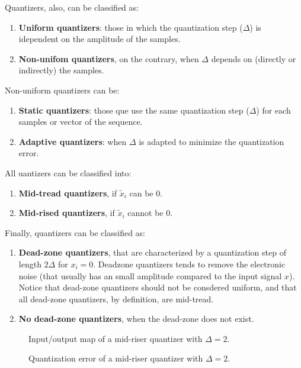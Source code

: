 Quantizers, also, can be classified as:
\begin{enumerate}
\item \textbf{Uniform quantizers}: those in which the quantization
  step ($\Delta$) is idependent on the amplitude of the samples.
\item \textbf{Non-unifom quantizers}, on the contrary, when $\Delta$
  depends on (directly or indirectly) the samples.
\end{enumerate}

Non-uniform quantizers can be:
\begin{enumerate}
\item \textbf{Static quantizers}: those que use the same quantization
  step ($\Delta$) for each samples or vector of the sequence.
\item \textbf{Adaptive quantizers}: when $\Delta$ is adapted to
  minimize the quantization error.
\end{enumerate}

All uantizers can be classified into:
\begin{enumerate}
\item \textbf{Mid-tread quantizers}, if $\tilde{x}_i$ can be $0$.
\item \textbf{Mid-rised quantizers}, if $\tilde{x}_i$ cannot be $0$.
\end{enumerate}

Finally, quantizers can be classified as:
\begin{enumerate}
\item \textbf{Dead-zone quantizers}, that are characterized by a
  quantization step of length $2\Delta$ for $x_i=0$. Deadzone
  quantizers tends to remove the electronic noise (that usually has an
  small amplitude compared to the input signal $x$). Notice that
  dead-zone quantizers should not be consdered uniform, and that all
  dead-zone quantizers, by definition, are mid-tread.
\item \textbf{No dead-zone quantizers}, when the dead-zone does not
  exist.
\end{enumerate}

\begin{figure}
  \centering
  \caption{Input/output map of a mid-riser quantizer with $\Delta=2$.}
  \label{fig:iomap_mr}
\end{figure}

\begin{figure}
  \centering
  \caption{Quantization error of a mid-riser quantizer with $\Delta=2$.}
  \label{fig:quantization_error_mr}
\end{figure}

